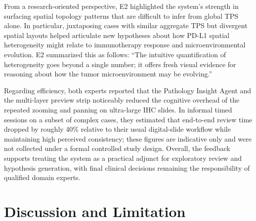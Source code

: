 \documentclass[journal]{vgtc}                     %
\begin{document}
From a research-oriented perspective, E2 highlighted the system's strength in surfacing spatial topology patterns that are difficult to infer from global TPS alone. In particular, juxtaposing cases with similar aggregate TPS but divergent spatial layouts helped articulate new hypotheses about how PD-L1 spatial heterogeneity might relate to immunotherapy response and microenvironmental evolution. E2 summarized this as follows: ``The intuitive quantification of heterogeneity goes beyond a single number; it offers fresh visual evidence for reasoning about how the tumor microenvironment may be evolving.''

Regarding efficiency, both experts reported that the Pathology Insight Agent and the multi-layer preview strip noticeably reduced the cognitive overhead of the repeated zooming and panning on ultra-large IHC slides. In informal timed sessions on a subset of complex cases, they estimated that end-to-end review time dropped by roughly 40\% relative to their usual digital-slide workflow while maintaining high perceived consistency; these figures are indicative only and were not collected under a formal controlled study design. Overall, the feedback supports treating the system as a practical adjunct for exploratory review and hypothesis generation, with final clinical decisions remaining the responsibility of qualified domain experts.



\section{Discussion and Limitation}
\end{document}
